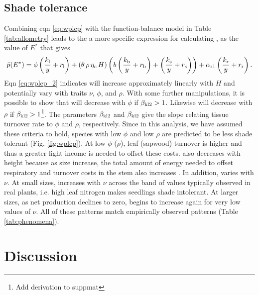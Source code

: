 \documentclass[a4paper,11pt]{article}
\begin{document}
\subsection{Shade tolerance}
Combining eqn \ref{eq:wplcp} with the function-balance model in Table \ref{tab:allometry} leads to the a more specific expression for calculating {\wplcp}, as the value of $E^*$ that gives
\begin{equation}\label{eq:wplcp_2}
\bar{p}(E^*) =
      \phi \left(\frac{k_{\rm l}}{y} + r_{\rm l}\right) +
      \left(\theta \, \rho \, \eta_c \, H\right)
        \left(b\left(\frac{k_{\rm b}}{y} + r_{\rm b}\right)
            + \left(\frac{k_{\rm s}}{y} + r_{\rm s}\right)\right) +
      \alpha_{\rm r1} \left(\frac{k_{\rm r}}{y} + r_{\rm r}\right).
\end{equation}
Eqn \ref{eq:wplcp_2} indicates {\wplcp} will increase approximately linearly with $H$ and potentially vary with traits $\nu$, $\phi$, and $\rho$. With some further manipulations, it is possible to show that {\wplcp} will decrease with $\phi$ if $\beta_{{\rm kl2}} >1$. Likewise {\wplcp} will decrease with $\rho$ if $\beta_{{\rm kl2}} >1$\footnote{Add derivation to suppmat}. The parameters $\beta_{{\rm kl2}}$ and $\beta_{{\rm kl2}}$ give the slope relating tissue turnover rate to $\phi$ and $\rho$, respectively. Since in this analysis, we have assumed these criteria to hold, species with low $\phi$ and low $\rho$ are predicted to be less shade tolerant (Fig. \ref{fig:wplcp}). At low $\phi$ ($\rho$), leaf (sapwood) turnover is higher and thus a greater light income is needed to offset these costs. {\wplcp} also decreases with height because as size increase, the total amount of energy needed to offset respiratory and turnover costs in the stem also increases \citep{Givnish-1988}. In addition, {\wplcp} varies with $\nu$. At small sizes, {\wplcp} increases with $\nu$ across the band of values typically observed in real plants, i.e. high leaf nitrogen makes seedlings shade intolerant. At larger sizes, as net production declines to zero, {\wplcp} begins to increase again for very low values of $\nu$. All of these patterns match empirically observed patterns (Table \ref{tab:phenomena}).

\section{Discussion}
\end{document}
